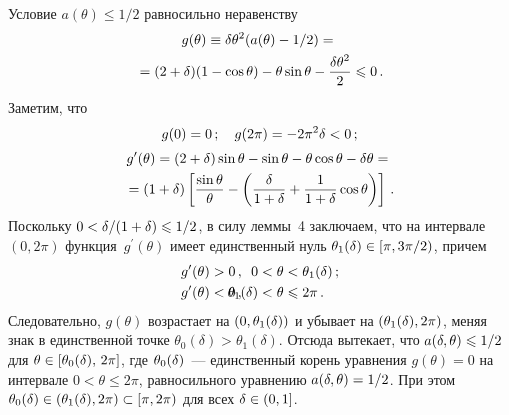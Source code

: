 \begin{multicols}{2}
Условие $a(\theta)\le 1/2$ равносильно неравенству
\begin{multline*}
g(\theta)\equiv\delta\theta^2(a(\theta)-1/2)={}\\
{}=
(2+\delta)(1-\cos\theta)-\theta\sin\theta-\displaystyle\frac{\displaystyle \delta\theta^2\mathstrut}{\displaystyle 2\mathstrut} \leqslant 0\,.
\end{multline*}
Заметим, что
$$
g(0)=0\,;\quad g(2\pi)=-2\pi^2\delta<0\,;
$$
\begin{multline*}
g^\prime(\theta)=(2+\delta)\sin\theta-\sin\theta-\theta\cos\theta-\delta\theta={}\\
{}=(1+\delta)\left[\displaystyle\frac{\displaystyle \sin
\theta\mathstrut}{\displaystyle \theta\mathstrut}-\left(\displaystyle\frac{\displaystyle \delta\mathstrut}{\displaystyle 1+\delta\mathstrut}+\displaystyle\frac{\displaystyle 1\mathstrut}{\displaystyle 1+\delta\mathstrut}\cos \theta\right)\right]\,.
\end{multline*}
Поскольку $0<\delta/(1+\delta)\leqslant1/2$, в силу леммы~4 заключаем,
что на интервале $(0,2\pi)$ функция~$g^\prime(\theta)$ имеет единственный
нуль $\theta_1(\delta)\in[\pi,3\pi/2)$, причем
\begin{align*}
  g^\prime(\theta)&>0\,, &\hspace*{-20pt} 0&<\theta<\theta_1(\d)\,; \\
  g^\prime(\theta)&<0\,, &\hspace*{-20pt} \theta_1(\d)&<\theta\le2\pi\,.
\end{align*}
Следовательно, $g(\theta)$ возрастает на $(0,\theta_1(\delta))$ и
убывает на $(\theta_1(\delta),2\pi)$, меняя знак в единственной точке
${\theta_0(\delta)>\theta_1(\delta)}$. Отсюда вытекает, что
${a(\delta,\theta)\leqslant1/2}$ для ${\theta\in[\theta_0(\delta),\,2\pi]}$, где
$\theta_0(\delta)$~--- единственный корень уравнения ${g(\theta)=0}$ на
интервале ${0<\theta\le2\pi}$, равносильного уравнению
$a(\delta,\theta)=1/2$. При этом
$\theta_0(\delta)\in(\theta_1(\delta),2\pi)\subset[\pi,2\pi)$ для всех
$\delta\in(0,1]$.


\end{multicols}
